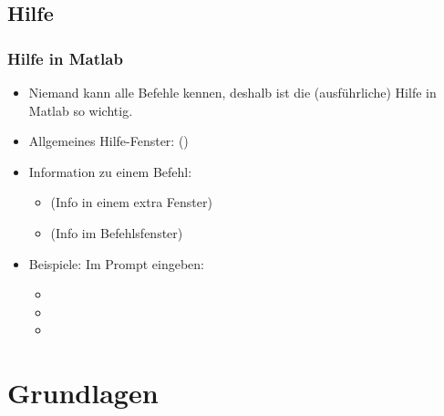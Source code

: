     \subsection{Hilfe}
    \begin{frame}
      \frametitle{Hilfe in Matlab}
      \begin{itemize}
        \itemsep0.3cm
        \item Niemand kann alle Befehle kennen, deshalb ist die (ausführliche) Hilfe in Matlab so wichtig.
        \item Allgemeines Hilfe-Fenster:  ()
        \item Information zu einem Befehl:

        \begin{itemize}
          \itemsep0.3cm
          \item {} (Info in einem extra Fenster)
          \item {} (Info im Befehlsfenster)
        \end{itemize}

        \item Beispiele: Im Prompt eingeben:

        \begin{itemize}
          \itemsep0.3cm
          \item {}
          \item {}
          \item {}
        \end{itemize}
      \end{itemize}
    \end{frame}

    \section{Grundlagen}
